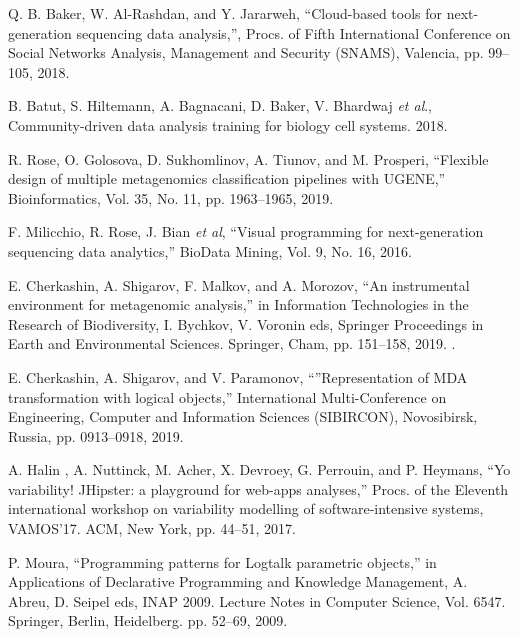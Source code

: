 \documentclass[a4paper]{jpconf}
\begin{document}
\begin{thebibliography}{0}
 Q. B. Baker, W. Al-Rashdan, and Y. Jararweh, ``Cloud-based tools for next-generation sequencing data analysis,'', Procs. of Fifth International Conference on Social Networks Analysis, Management and Security (SNAMS), Valencia, pp. 99--105, 2018. 


 B. Batut, S. Hiltemann, A. Bagnacani, D. Baker, V. Bhardwaj \emph{et al}., Community-driven data analysis training for biology cell systems. 2018. 

  R. Rose, O. Golosova, D. Sukhomlinov, A. Tiunov, and M. Prosperi, ``Flexible design of multiple metagenomics classification pipelines with UGENE,'' Bioinformatics, Vol. 35, No. 11, pp. 1963--1965, 2019. 

 F. Milicchio, R. Rose, J. Bian \emph{et al}, ``Visual programming for next-generation sequencing data analytics,'' BioData Mining, Vol. 9, No. 16, 2016. 

 E. Cherkashin, A. Shigarov, F. Malkov, and A. Morozov, ``An instrumental environment for metagenomic analysis,'' in Information Technologies in the Research of Biodiversity, I. Bychkov, V. Voronin eds, Springer Proceedings in Earth and Environmental Sciences. Springer, Cham, pp. 151--158, 2019. .

  E. Cherkashin, A. Shigarov, and V. Paramonov, ``''Representation of MDA transformation with logical objects,'' International Multi-Conference on Engineering, Computer and Information Sciences (SIBIRCON), Novosibirsk, Russia, pp. 0913--0918, 2019. 

 A. Halin , A. Nuttinck, M. Acher, X. Devroey, G. Perrouin, and P. Heymans, ``Yo variability! JHipster: a playground for web-apps analyses,'' Procs. of the Eleventh international workshop on variability modelling of software-intensive systems, VAMOS’17. ACM, New York, pp. 44–51, 2017. 

 P. Moura, ``Programming patterns for Logtalk parametric objects,'' in Applications of Declarative Programming and Knowledge Management, A. Abreu, D. Seipel eds, INAP 2009. Lecture Notes in Computer Science, Vol. 6547. Springer, Berlin, Heidelberg. pp. 52--69, 2009. 


\end{thebibliography}
\end{document}
